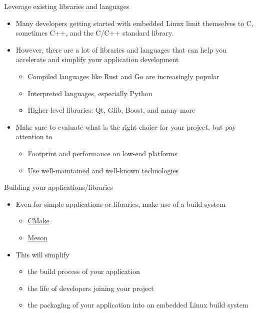 \begin{frame}{Leverage existing libraries and languages}
  \begin{itemize}
  \item Many developers getting started with embedded Linux limit
    themselves to C, sometimes C++, and the C/C++ standard library.
  \item However, there are a lot of libraries and languages that can
    help you accelerate and simplify your application development
    \begin{itemize}
    \item Compiled languages like Rust and Go are increasingly popular
    \item Interpreted languages, especially Python
    \item Higher-level libraries: Qt, Glib, Boost, and many more
    \end{itemize}
  \item Make sure to evaluate what is the right choice for your
    project, but pay attention to
    \begin{itemize}
    \item Footprint and performance on low-end platforms
    \item Use well-maintained and well-known technologies
    \end{itemize}
  \end{itemize}
\end{frame}

\begin{frame}{Building your applications/libraries}
  \begin{itemize}
  \item Even for simple applications or libraries, make use of a build
    system
    \begin{itemize}
    \item \href{https://cmake.org/}{CMake}
    \item \href{https://mesonbuild.com/}{Meson}
    \end{itemize}
  \item This will simplify
    \begin{itemize}
    \item the build process of your application
    \item the life of developers joining your project
    \item the packaging of your application into an embedded Linux
      build system
    \end{itemize}
  \end{itemize}
\end{frame}

